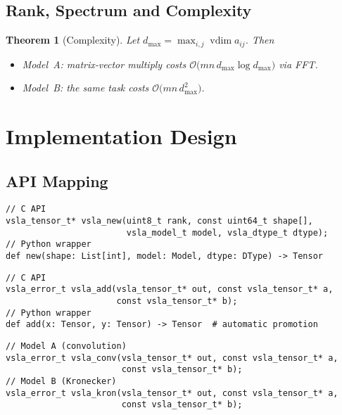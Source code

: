 \documentclass[11pt]{article}
\newtheorem{theorem}{Theorem}[section]
\newcommand{\vdim}{\operatorname{vdim}}
\begin{document}
\subsection{Rank, Spectrum and Complexity}
\begin{theorem}[Complexity]\label{thm:complexity}
Let $d_{\max}=\max_{i,j}\vdim a_{ij}$.  Then
\begin{itemize}[leftmargin=1.5em]
  \item Model A: matrix‑vector multiply costs $\mathcal O\bigl(mn\,d_{\max}\log d_{\max}\bigr)$ via FFT.
  \item Model B: the same task costs $\mathcal O\bigl(mn\,d_{\max}^{2}\bigr)$.
\end{itemize}
\end{theorem}

\section{Implementation Design}
\label{sec:implementation}

\subsection{API Mapping}
\label{sec:api}

\begin{tcolorbox}[colback=api,colframe=green!50!black,title=C Library API Mapping]
\begin{description}[leftmargin=2em]
\item[Tensor Creation:] 
\begin{verbatim}
// C API
vsla_tensor_t* vsla_new(uint8_t rank, const uint64_t shape[], 
                        vsla_model_t model, vsla_dtype_t dtype);
// Python wrapper  
def new(shape: List[int], model: Model, dtype: DType) -> Tensor
\end{verbatim}

\item[Variable-Shape Operations:]
\begin{verbatim}
// C API  
vsla_error_t vsla_add(vsla_tensor_t* out, const vsla_tensor_t* a, 
                      const vsla_tensor_t* b);
// Python wrapper
def add(x: Tensor, y: Tensor) -> Tensor  # automatic promotion
\end{verbatim}

\item[Semiring Products:]
\begin{verbatim}
// Model A (convolution)
vsla_error_t vsla_conv(vsla_tensor_t* out, const vsla_tensor_t* a, 
                       const vsla_tensor_t* b);
// Model B (Kronecker)  
vsla_error_t vsla_kron(vsla_tensor_t* out, const vsla_tensor_t* a,
                       const vsla_tensor_t* b);
\end{verbatim}
\end{description}
\end{tcolorbox}
\end{document}
